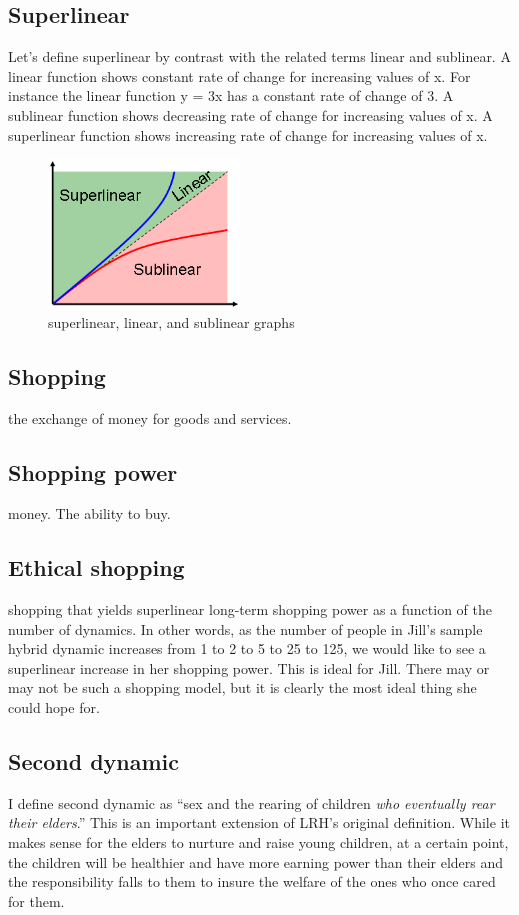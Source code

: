\documentclass{article}%
\begin{document}
\subsection{Superlinear}
Let's define superlinear by contrast with the related terms linear and sublinear. A linear function shows constant rate of change for increasing values of x. For instance the linear function y = 3x has a constant rate of change of 3. A sublinear function shows decreasing rate of change for increasing values of x. A superlinear function shows increasing rate of change for increasing values of x. 

\begin{figure}[h]
\centering
	\includegraphics[width=2in]{superlinear.png}
	\caption{superlinear, linear, and sublinear graphs}
\end{figure}

\subsection{Shopping} the exchange of money for goods and services.

\subsection{Shopping power} money. The ability to buy.  

\subsection{Ethical shopping}
shopping that yields superlinear long-term shopping power as a function of the number of dynamics. In other words, as the number of people in Jill's sample hybrid dynamic increases from 1 to 2 to 5 to 25 to 125, we would like to see a superlinear increase in her shopping power. This is ideal for Jill. There may or may not be such a shopping model, but it is clearly the most ideal thing she could hope for.

\subsection{Second dynamic}
I define second dynamic as ``sex and the rearing of children \emph{who eventually rear their elders}.'' This is an important extension of LRH's original definition. While it makes sense for the elders to nurture and raise young children, at a certain point, the children will be healthier and have more earning power than their elders and the responsibility falls to them to insure the welfare of the ones who once cared for them.
\end{document}
